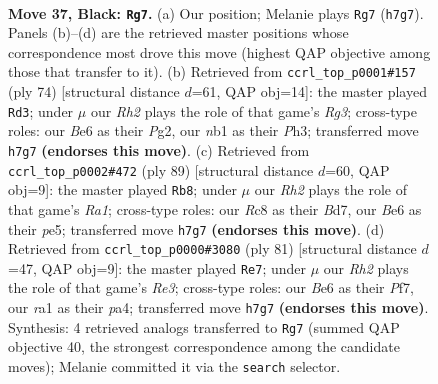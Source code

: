 \documentclass[11pt]{article}
\begin{document}
\clearpage

\begin{figure}[p]\centering
\begin{subfigure}{0.46\textwidth}\centering
\resizebox{\linewidth}{!}{%
\newchessgame
\chessboard[
  setfen={2r5/p1pk1p1r/P1p1b1p1/2P4p/1P3P1P/8/6R1/RN2K3 b Q - 3 37},
  showmover=false,
  pgfstyle=straightmove, color=movearrow, markmove={h7-g7}
]}
\caption{}
\end{subfigure}\hfill
\begin{subfigure}{0.46\textwidth}\centering
\resizebox{\linewidth}{!}{%
\newchessgame
\chessboard[
  setfen={6k1/4rpp1/p2p4/2p5/2Pn1PB1/1P4RP/P5PK/8 w - - 1 38},
  showmover=false,
  pgfstyle=straightmove, color=movearrow, markmove={g3-d3}
]}
\caption{}
\end{subfigure}
\\[4pt]
\begin{subfigure}{0.46\textwidth}\centering
\resizebox{\linewidth}{!}{%
\newchessgame
\chessboard[
  setfen={r7/3b4/2p2P2/p2pP2p/P2P1kpP/6p1/1pR1K1P1/1B6 b - - 1 45},
  showmover=false,
  pgfstyle=straightmove, color=movearrow, markmove={a8-b8}
]}
\caption{}
\end{subfigure}\hfill
\begin{subfigure}{0.46\textwidth}\centering
\resizebox{\linewidth}{!}{%
\newchessgame
\chessboard[
  setfen={8/p4p2/1p2r1k1/5p1p/PPPRpP1P/6P1/8/6K1 b - - 0 41},
  showmover=false,
  pgfstyle=straightmove, color=movearrow, markmove={e6-e7}
]}
\caption{}
\end{subfigure}
\caption{\textbf{Move 37, Black: \texttt{Rg7}.} (a) Our position; Melanie plays \texttt{Rg7} (\texttt{h7g7}). Panels (b)--(d) are the retrieved master positions whose correspondence most drove this move (highest QAP objective among those that transfer to it). (b) Retrieved from \texttt{ccrl\_top\_p0001\#157} (ply 74) [structural distance $d$=61, QAP obj=14]: the master played \texttt{Rd3}; under $\mu$ our \emph{Rh2} plays the role of that game's \emph{Rg3}; cross-type roles: our \emph{B}e6 as their \emph{P}g2, our \emph{n}b1 as their \emph{P}h3; transferred move \texttt{h7g7} \textbf{(endorses this move)}. (c) Retrieved from \texttt{ccrl\_top\_p0002\#472} (ply 89) [structural distance $d$=60, QAP obj=9]: the master played \texttt{Rb8}; under $\mu$ our \emph{Rh2} plays the role of that game's \emph{Ra1}; cross-type roles: our \emph{R}c8 as their \emph{B}d7, our \emph{B}e6 as their \emph{p}e5; transferred move \texttt{h7g7} \textbf{(endorses this move)}. (d) Retrieved from \texttt{ccrl\_top\_p0000\#3080} (ply 81) [structural distance $d$=47, QAP obj=9]: the master played \texttt{Re7}; under $\mu$ our \emph{Rh2} plays the role of that game's \emph{Re3}; cross-type roles: our \emph{B}e6 as their \emph{P}f7, our \emph{r}a1 as their \emph{p}a4; transferred move \texttt{h7g7} \textbf{(endorses this move)}. Synthesis: 4 retrieved analogs transferred to \texttt{Rg7} (summed QAP objective 40, the strongest correspondence among the candidate moves); Melanie committed it via the \texttt{search} selector.}
\label{fig:thought-m73}
\end{figure}
\end{document}
